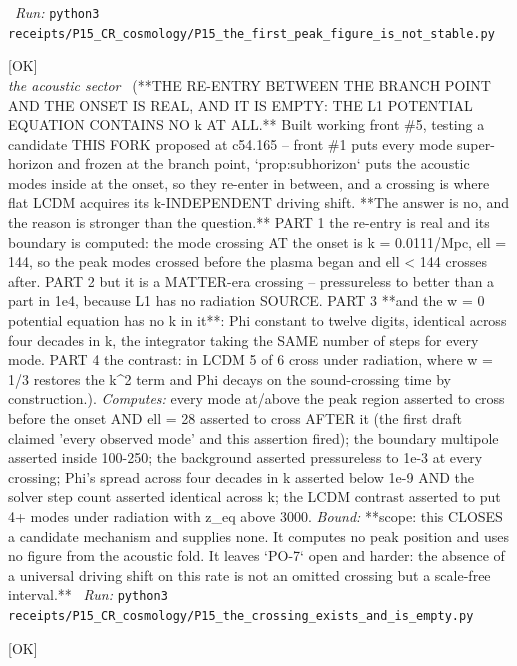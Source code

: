 \begin{description}
\ \emph{Run:} \texttt{python3 receipts/P15\_CR\_cosmology/P15\_the\_first\_peak\_figure\_is\_not\_stable.py}
\item[\rcptlabel{P15_the_crossing_exists_and_is_empty}{P15R62}\textbf{P15R62}\quad\texttt{P15\_the\_crossing\_exists\_and\_is\_empty}]\hfill\textsf{[OK]}\\
\textit{the acoustic sector} \ (**THE RE-ENTRY BETWEEN THE BRANCH POINT AND THE ONSET IS REAL, AND IT IS EMPTY: THE L1 POTENTIAL EQUATION CONTAINS NO k AT ALL.** Built working front \#5, testing a candidate THIS FORK proposed at c54.165 -- front \#1 puts every mode super-horizon and frozen at the branch point, `prop:subhorizon` puts the acoustic modes inside at the onset, so they re-enter in between, and a crossing is where flat LCDM acquires its k-INDEPENDENT driving shift. **The answer is no, and the reason is stronger than the question.** PART 1 the re-entry is real and its boundary is computed: the mode crossing AT the onset is k = 0.0111/Mpc, ell = 144, so the peak modes crossed before the plasma began and ell < 144 crosses after. PART 2 but it is a MATTER-era crossing -- pressureless to better than a part in 1e4, because L1 has no radiation SOURCE. PART 3 **and the w = 0 potential equation has no k in it**: Phi constant to twelve digits, identical across four decades in k, the integrator taking the SAME number of steps for every mode. PART 4 the contrast: in LCDM 5 of 6 cross under radiation, where w = 1/3 restores the k\textasciicircum{}2 term and Phi decays on the sound-crossing time by construction.). 
\emph{Computes:} every mode at/above the peak region asserted to cross before the onset AND ell = 28 asserted to cross AFTER it (the first draft claimed 'every observed mode' and this assertion fired); the boundary multipole asserted inside 100-250; the background asserted pressureless to 1e-3 at every crossing; Phi's spread across four decades in k asserted below 1e-9 AND the solver step count asserted identical across k; the LCDM contrast asserted to put 4+ modes under radiation with z\_eq above 3000.
 \emph{Bound:} **scope: this CLOSES a candidate mechanism and supplies none. It computes no peak position and uses no figure from the acoustic fold. It leaves `PO-7` open and harder: the absence of a universal driving shift on this rate is not an omitted crossing but a scale-free interval.**
\ \emph{Run:} \texttt{python3 receipts/P15\_CR\_cosmology/P15\_the\_crossing\_exists\_and\_is\_empty.py}
\item[\rcptlabel{P15_two_arm_control_and_guard}{P15R63}\textbf{P15R63}\quad\texttt{P15\_two\_arm\_control\_and\_guard}]\hfill\textsf{[OK]}\\

\end{description}
